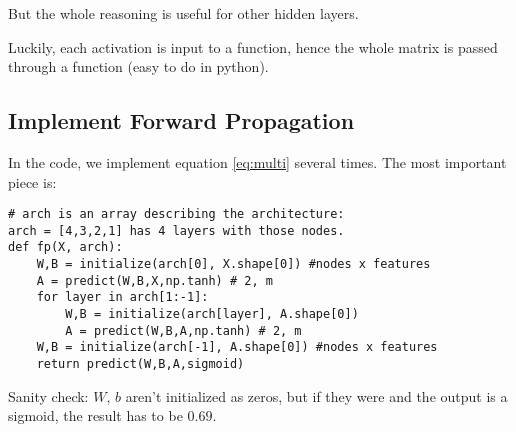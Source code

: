 But the whole reasoning is useful for other hidden layers.

Luckily, each activation is input to a function, hence the whole matrix is passed through a function (easy to do in python).

\subsection{Implement Forward Propagation}
In the code, we implement equation \ref{eq:multi} several times. The most important piece is:

\begin{verbatim}
# arch is an array describing the architecture:
arch = [4,3,2,1] has 4 layers with those nodes.
def fp(X, arch):
    W,B = initialize(arch[0], X.shape[0]) #nodes x features
    A = predict(W,B,X,np.tanh) # 2, m
    for layer in arch[1:-1]:
        W,B = initialize(arch[layer], A.shape[0]) 
        A = predict(W,B,A,np.tanh) # 2, m
    W,B = initialize(arch[-1], A.shape[0]) #nodes x features
    return predict(W,B,A,sigmoid)
\end{verbatim}

Sanity check: $W$, $b$ aren't initialized as zeros, but if they were and the output is a sigmoid, the result has to be $0.69$.

